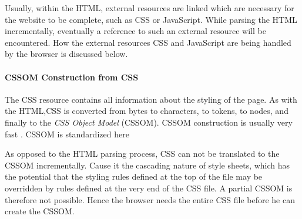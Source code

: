 
Usually, within the HTML, external resources are linked which are necessary for the website to be complete, such as CSS or JavaScript.
While parsing the HTML incrementally, eventually a reference to such an external resource will be encountered.
How the external resources CSS and JavaScript are being handled by the browser is discussed below.









\paragraph{CSSOM Construction from CSS}



The CSS resource contains all information about the styling of the page.
As with the HTML,CSS is converted from bytes to characters, to tokens, to nodes, and finally to the \textit{CSS Object Model} (CSSOM). %
CSSOM construction is usually very fast . %
CSSOM is standardized here %





As opposed to the HTML parsing process, CSS can not be translated to the CSSOM incrementally.
Cause it the cascading nature of style sheets, which has the potential that the styling rules defined at the top of the file may be overridden by rules defined at the very end of the CSS file.
A partial CSSOM is therefore not possible.
Hence the browser needs the entire CSS file before he can create the CSSOM.


